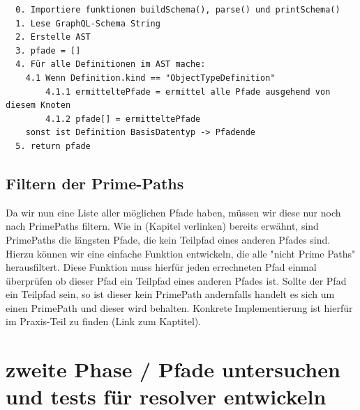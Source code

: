 \begin{verbatim}
  0. Importiere funktionen buildSchema(), parse() und printSchema()
  1. Lese GraphQL-Schema String
  2. Erstelle AST
  3. pfade = []
  4. Für alle Definitionen im AST mache:
    4.1 Wenn Definition.kind == "ObjectTypeDefinition"
        4.1.1 ermitteltePfade = ermittel alle Pfade ausgehend von diesem Knoten
        4.1.2 pfade[] = ermitteltePfade
    sonst ist Definition BasisDatentyp -> Pfadende
  5. return pfade
\end{verbatim}















































\subsection{Filtern der Prime-Paths}

Da wir nun eine Liste aller möglichen Pfade haben, müssen wir diese nur noch nach PrimePaths filtern.
Wie in (Kapitel verlinken) bereits erwähnt, sind PrimePaths die längsten Pfade, die kein Teilpfad eines anderen Pfades sind.
Hierzu können wir eine einfache Funktion entwickeln, die alle "nicht Prime Paths" herausfiltert.
Diese Funktion muss hierfür jeden errechneten Pfad einmal überprüfen ob dieser Pfad ein Teilpfad eines anderen Pfades ist.
Sollte der Pfad ein Teilpfad sein, so ist dieser kein PrimePath andernfalls handelt es sich um einen PrimePath und
dieser wird behalten. Konkrete Implementierung ist hierfür im Praxis-Teil zu finden (Link zum Kaptitel).

\section{zweite Phase / Pfade untersuchen und tests für resolver entwickeln}